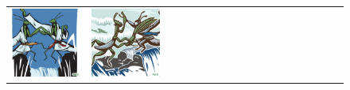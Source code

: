 \begin{figure}[ht!]
\begin{adjustwidth}{-0.8in}{-0.5in}
\begin{tabular}{cccccccccccccccccccc}
\multicolumn{2}{c}{\includegraphics[width=\threebythreecolwidth\textwidth]{figures/cherries/mantis_0.jpg}} &
\multicolumn{2}{c}{\includegraphics[width=\threebythreecolwidth\textwidth]{figures/cherries/mantis_1.jpg}} &

\end{tabular}
\end{adjustwidth}
\end{figure}
